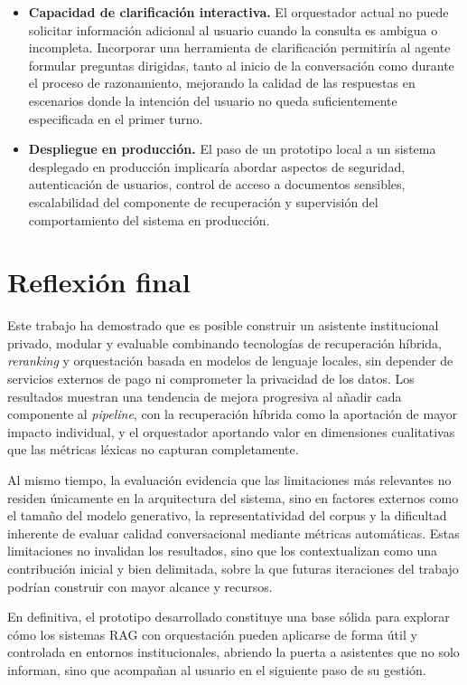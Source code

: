 \begin{itemize}
    \item \textbf{Capacidad de clarificación interactiva.} El orquestador actual no puede solicitar información adicional al usuario cuando la consulta es ambigua o incompleta. Incorporar una herramienta de clarificación permitiría al agente formular preguntas dirigidas, tanto al inicio de la conversación como durante el proceso de razonamiento, mejorando la calidad de las respuestas en escenarios donde la intención del usuario no queda suficientemente especificada en el primer turno.

    \item \textbf{Despliegue en producción.} El paso de un prototipo local a un sistema desplegado en producción implicaría abordar aspectos de seguridad, autenticación de usuarios, control de acceso a documentos sensibles, escalabilidad del componente de recuperación y supervisión del comportamiento del sistema en producción. 
\end{itemize}

\section{Reflexión final}\label{sec:reflexion-final}

Este trabajo ha demostrado que es posible construir un asistente institucional privado, modular y evaluable combinando tecnologías de recuperación híbrida, \textit{reranking} y orquestación basada en modelos de lenguaje locales, sin depender de servicios externos de pago ni comprometer la privacidad de los datos. 
Los resultados muestran una tendencia de mejora progresiva al añadir cada componente al \textit{pipeline}, con la recuperación híbrida como la aportación de mayor impacto individual, y el orquestador aportando valor en dimensiones cualitativas que las métricas léxicas no capturan completamente.

Al mismo tiempo, la evaluación evidencia que las limitaciones más relevantes no residen únicamente en la arquitectura del sistema, sino en factores externos como el tamaño del modelo generativo, la representatividad del corpus y la dificultad inherente de evaluar calidad conversacional mediante métricas automáticas. 
Estas limitaciones no invalidan los resultados, sino que los contextualizan como una contribución inicial y bien delimitada, sobre la que futuras iteraciones del trabajo podrían construir con mayor alcance y recursos.

En definitiva, el prototipo desarrollado constituye una base sólida para explorar cómo los sistemas RAG con orquestación pueden aplicarse de forma útil y controlada en entornos institucionales, abriendo la puerta a asistentes que no solo informan, sino que acompañan al usuario en el siguiente paso de su gestión.
